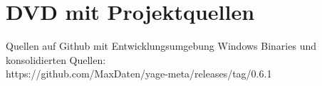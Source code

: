\chapter[DVD mit Projektquellen]{DVD mit Projektquellen}\label{chap:dvd}

Quellen auf Github mit Entwicklungsumgebung Windows Binaries und konsolidierten Quellen:\\
https://github.com/MaxDaten/yage-meta/releases/tag/0.6.1

